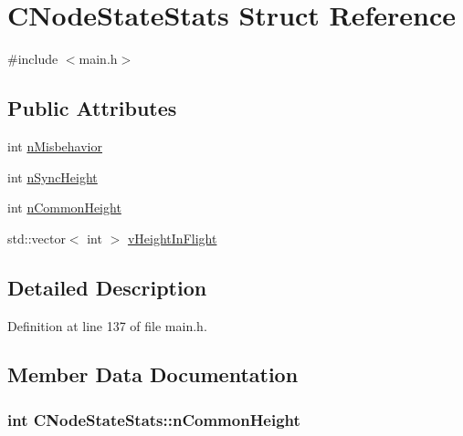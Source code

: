 \hypertarget{struct_c_node_state_stats}{}\section{C\+Node\+State\+Stats Struct Reference}
\label{struct_c_node_state_stats}


{\ttfamily \#include $<$main.\+h$>$}

\subsection*{Public Attributes}
\begin{DoxyCompactItemize}
\item 
int \hyperlink{struct_c_node_state_stats_a62c2243d09166c1daaad84519700da3c}{n\+Misbehavior}
\item 
int \hyperlink{struct_c_node_state_stats_a7646deac801098e973a5bc50202f92cd}{n\+Sync\+Height}
\item 
int \hyperlink{struct_c_node_state_stats_a67c910a57285a63bbf0bb88ea7a9ca05}{n\+Common\+Height}
\item 
std\+::vector$<$ int $>$ \hyperlink{struct_c_node_state_stats_a4b03fd8ecaa9268f7eca836e5e79c35a}{v\+Height\+In\+Flight}
\end{DoxyCompactItemize}


\subsection{Detailed Description}


Definition at line 137 of file main.\+h.



\subsection{Member Data Documentation}
\hypertarget{struct_c_node_state_stats_a67c910a57285a63bbf0bb88ea7a9ca05}{}
\subsubsection[{n\+Common\+Height}]{\setlength{\rightskip}{0pt plus 5cm}int C\+Node\+State\+Stats\+::n\+Common\+Height}\label{struct_c_node_state_stats_a67c910a57285a63bbf0bb88ea7a9ca05}


